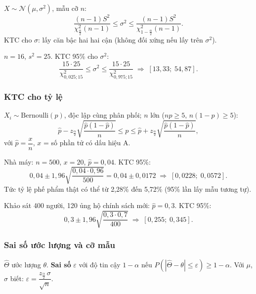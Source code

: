 \documentclass[12pt,a4paper]{article}
\begin{document}
\begin{congthuc}[title={KTC cho $\sigma^2$}]
  $X \sim \mathcal{N}(\mu,\sigma^2)$, mẫu cỡ $n$:
  \[
    \dfrac{(n-1)S^2}{\chi^2_{\frac{\alpha}{2}}(n-1)} \le \sigma^2 \le \dfrac{(n-1)S^2}{\chi^2_{1-\frac{\alpha}{2}}(n-1)}.
  \]
  KTC cho $\sigma$: lấy căn bậc hai hai cận (không đối xứng nếu lấy trên $\sigma^2$).
\end{congthuc}

\begin{vidu}[title={KTC cho phương sai}]
$n=16$, $s^2 = 25$. KTC 95\% cho $\sigma^2$:
\[
  \dfrac{15 \cdot 25}{\chi^2_{0{,}025;15}} \le \sigma^2 \le \dfrac{15 \cdot 25}{\chi^2_{0{,}975;15}}
  \;\Rightarrow\; [13{,}33;\; 54{,}87].
\]
\end{vidu}

\subsubsection{KTC cho tỷ lệ}

\begin{congthuc}[title={KTC cho tỷ lệ $p$ - mẫu lớn}]
  $X_i \sim \text{Bernoulli}(p)$, độc lập cùng phân phối; $n$ lớn ($np \ge 5$, $n(1-p) \ge 5$):
  \[
    \hat{p} - z_{\frac{\alpha}{2}}\sqrt{\dfrac{\hat{p}(1-\hat{p})}{n}} \le p \le \hat{p} + z_{\frac{\alpha}{2}}\sqrt{\dfrac{\hat{p}(1-\hat{p})}{n}},
  \]
  với $\hat{p} = \dfrac{x}{n}$, $x$ = số phần tử có dấu hiệu A.
\end{congthuc}

\begin{vidu}[title={KTC cho tỷ lệ phế phẩm 4\%}]
Nhà máy: $n=500$, $x=20$, $\hat{p} = 0{,}04$. KTC 95\%:
\[
  0{,}04 \pm 1{,}96\sqrt{\dfrac{0{,}04 \cdot 0{,}96}{500}}
  = 0{,}04 \pm 0{,}0172 \;\Rightarrow\; [0{,}0228;\; 0{,}0572].
\]
Tức tỷ lệ phế phẩm thật có thể từ 2{,}28\% đến 5{,}72\% (95\% lần lấy mẫu tương tự).
\end{vidu}

\begin{vidu}[title={KTC cho tỷ lệ}]
Khảo sát 400 người, 120 ủng hộ chính sách mới: $\hat{p} = 0{,}3$. KTC 95\%:
\[
  0{,}3 \pm 1{,}96\sqrt{\dfrac{0{,}3 \cdot 0{,}7}{400}} \;\Rightarrow\; [0{,}255;\; 0{,}345].
\]
\end{vidu}

\subsubsection{Sai số ước lượng và cỡ mẫu}

\begin{dinhnghia}[title={Sai số ước lượng}]
  $\hat{\Theta}$ ước lượng $\theta$. \textbf{Sai số} $\varepsilon$ với độ tin cậy $1-\alpha$ nếu $P(|\hat{\Theta}-\theta| \le \varepsilon) \ge 1-\alpha$.
  Với $\mu$, $\sigma$ biết: $\varepsilon = \dfrac{z_{\frac{\alpha}{2}}\,\sigma}{\sqrt{n}}$.
\end{dinhnghia}
\end{document}
